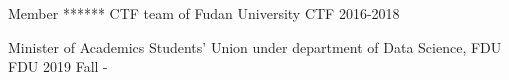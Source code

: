 

\begin{cvhonors}

  \cvhonor
    {Member} %
    {****** CTF team of Fudan University} %
    {CTF} %
    {2016-2018} %

  \cvhonor
    {Minister of Academics} %
    {Students' Union under department of Data Science, FDU} %
    {FDU} %
    {2019 Fall -} %

\end{cvhonors}
